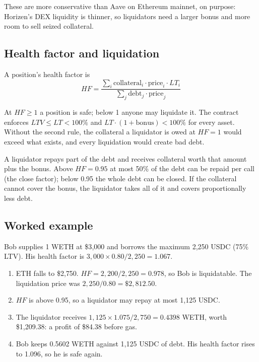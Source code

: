 \documentclass[11pt,a4paper]{article}
\begin{document}
These are more conservative than Aave on Ethereum mainnet, on purpose: Horizen's DEX liquidity is thinner, so
liquidators need a larger bonus and more room to sell seized collateral.

\subsection{Health factor and liquidation}

A position's health factor is
\begin{equation}
  HF = \frac{\sum_i \text{collateral}_i \cdot \text{price}_i \cdot LT_i}{\sum_j \text{debt}_j \cdot \text{price}_j}
\end{equation}

At $HF \ge 1$ a position is safe; below 1 anyone may liquidate it. The contract enforces
$LTV \le LT < 100\%$ and $LT \cdot (1 + \text{bonus}) < 100\%$ for every asset. Without the second rule, the
collateral a liquidator is owed at $HF = 1$ would exceed what exists, and every liquidation would create bad
debt.

A liquidator repays part of the debt and receives collateral worth that amount plus the bonus. Above
$HF = 0.95$ at most 50\% of the debt can be repaid per call (the close factor); below 0.95 the whole debt can be
closed. If the collateral cannot cover the bonus, the liquidator takes all of it and covers proportionally less
debt.

\subsection{Worked example}

Bob supplies 1 WETH at \$3{,}000 and borrows the maximum 2{,}250 USDC (75\% LTV). His health factor is
$3{,}000 \times 0.80 / 2{,}250 = 1.067$.
\begin{enumerate}
  \item ETH falls to \$2{,}750. $HF = 2{,}200 / 2{,}250 = 0.978$, so Bob is liquidatable. The liquidation price
        was $2{,}250 / 0.80 = \$2{,}812.50$.
  \item $HF$ is above 0.95, so a liquidator may repay at most 1{,}125 USDC.
  \item The liquidator receives $1{,}125 \times 1.075 / 2{,}750 = 0.4398$ WETH, worth \$1{,}209.38: a profit of
        \$84.38 before gas.
  \item Bob keeps 0.5602 WETH against 1{,}125 USDC of debt. His health factor rises to 1.096, so he is safe
        again.
\end{enumerate}
\end{document}
